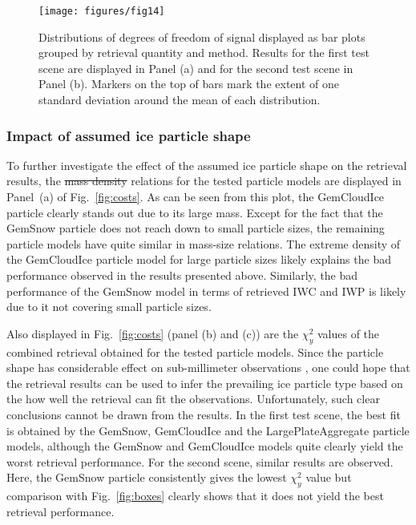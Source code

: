 \documentclass[journal abbreviation, manuscript]{copernicus}
\providecommand{\DIFadd}[1]{{\protect\color{blue}\uwave{#1}}} %
\providecommand{\DIFdel}[1]{{\protect\color{red}\sout{#1}}}                      %
\providecommand{\DIFaddbegin}{} %
\providecommand{\DIFaddend}{} %
\providecommand{\DIFdelbegin}{} %
\providecommand{\DIFdelend}{} %
\begin{document}
\begin{figure}
\centering
\texttt{[image: figures/fig14]}
\caption{Distributions of degrees of freedom of signal displayed as bar plots
  grouped by retrieval quantity and method. Results for the first test scene are
  displayed in Panel (a) and for the second test scene in Panel (b). Markers on
  the top of bars mark the extent of one standard deviation around the mean of
  each distribution.}
\label{fig:dofs}
\end{figure}

\subsubsection{Impact of assumed ice particle shape}



To further investigate the effect of the assumed ice particle shape on the
retrieval results, the \DIFdelbegin \DIFdel{mass density }\DIFdelend \DIFaddbegin \DIFadd{mass-size }\DIFaddend relations for the tested particle models are
displayed in Panel~(a) of Fig.~\ref{fig:costs}. As can be seen from this plot,
the GemCloudIce particle clearly stands out due to its large mass. Except for
the fact that the GemSnow particle does not reach down to small particle sizes,
the remaining particle models have quite similar in mass-size relations. The
extreme density of the GemCloudIce particle model for large particle sizes likely
explains the bad performance observed in the results presented above. Similarly,
the bad performance of the GemSnow model in terms of retrieved IWC and IWP is likely
due to it not covering small particle sizes.

Also displayed in Fig.~\ref{fig:costs} (panel (b) and (c)) are the $\chi^2_y$
values of the combined retrieval obtained for the tested particle models. Since
the particle shape has considerable effect on sub-millimeter observations
\citep{ekelund19}, one could hope that the retrieval results can be used to
infer the prevailing ice particle type based on the how well the retrieval can
fit the observations. Unfortunately, such clear conclusions cannot be drawn from
the results. In the first test scene, the best fit is obtained by the GemSnow,
GemCloudIce and the LargePlateAggregate particle models, although the GemSnow
and GemCloudIce models quite clearly yield the worst retrieval performance. For
the second scene, similar results are observed. Here, the GemSnow particle
consistently gives the lowest $\chi^2_y$ value but comparison with
Fig.~\ref{fig:boxes} clearly shows that it does not yield the best retrieval
performance.
\end{document}

